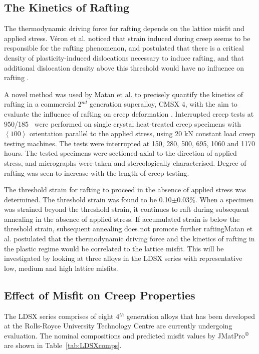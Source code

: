 \subsection{The Kinetics of Rafting}

The thermodynamic driving force for rafting depends on the lattice misfit and applied stress.  V\'{e}ron et al. noticed that strain induced during creep seems to be responsible for the rafting phenomenon, and postulated that there is a critical density of plasticity-induced dislocations necessary to induce rafting, and that additional dislocation density above this threshold would have no influence on rafting \cite{veron96}.

A novel method was used by Matan et al. to precisely quantify the kinetics of rafting in a commercial 2$^{nd}$ generation superalloy, CMSX 4, with the aim to evaluate the influence of rafting on creep deformation \cite{matan99}.  Interrupted creep tests at 950\celsius/185 \mega\pascal\ were performed on single crystal heat-treated creep specimens with $\left<100\right>$ orientation parallel to the applied stress, using 20 kN constant load creep testing machines.  The tests were interrupted  at 150, 280, 500, 695, 1060 and 1170 hours.  The tested specimens were sectioned axial to the direction of applied stress, and micrographs were taken and stereologically characterised.  Degree of rafting was seen to increase with the length of creep testing.

The threshold strain for rafting to proceed in the absence of applied stress was determined.  The threshold strain was found to be 0.10$\pm$0.03\%.  When a specimen was strained beyond the threshold strain, it continues to raft during subsequent annealing in the absence of applied stress.  If accumulated strain is below the threshold strain, subsequent annealing does not promote further raftingMatan et al. postulated that the thermodynamic driving force and the kinetics of rafting in the plastic regime would be correlated to the lattice misfit. This will be investigated by looking at three alloys in the LDSX series with representative low, medium and high lattice misfits.

\subsection{Effect of Misfit on Creep Properties}

The LDSX series comprises of eight 4$^{th}$ generation alloys that has been developed at the Rolls-Royce University Technology Centre are currently undergoing evaluation.  The nominal compositions and predicted misfit values by JMatPro$^{\copyright}$ are shown in Table~\ref{tab:LDSXcomps}.

